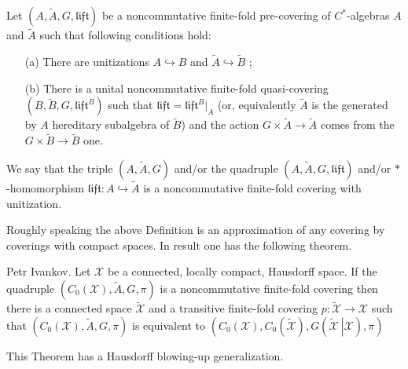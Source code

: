 \documentclass{beamer}
\theoremstyle{plain}
\newcommand{\lift}{\mathfrak{lift}}
\newcommand{\sX}{\mathcal{X}}       %
\newcommand{\hookto}{\hookrightarrow}        %
\begin{document}
\begin{frame}
	
\begin{definition}
	Let $\left(A, \widetilde{A}, G, \lift \right)$ be a noncommutative finite-fold  pre-covering  of $C^*$-algebras $A$ and $\widetilde{A}$ such  that following conditions hold:
	\begin{enumerate}
		\item[(a)] 
		There are unitizations $A \hookto B$  and $\widetilde{A} \hookto \widetilde{B}$ ;
		\item[(b)] There is a %
		unital  noncommutative finite-fold quasi-covering	$\left(B ,\widetilde{B}, G, {\lift}^B \right)$  such that
		$\lift = {\lift}^B|_A$ (or, equivalently $\widetilde A$ is the generated by $A$ hereditary subalgebra of $\widetilde B$) and
		the action $G \times\widetilde{A} \to \widetilde{A}$ comes from  the $G \times\widetilde{B} \to \widetilde{B}$ one.
	\end{enumerate}
	We say that the triple $\left(A, \widetilde{A}, G \right)$ and/or the quadruple $\left(A, \widetilde{A}, G, \lift \right)$ and/or $*$-homomorphism $\lift: A \hookto \widetilde{A}$ is a
	\alert{noncommutative finite-fold covering with unitization}. 
\end{definition}

\end{frame}
\begin{frame}
	Roughly speaking the above  Definition is an approximation of any covering by coverings with compact spaces.	
	In result one has the following theorem.
	\begin{theorem}
		\alert{Petr Ivankov}. 	Let $\mathcal X$ be a connected, locally compact, Hausdorff space.
		If the  quadruple $\left(C_0\left(\mathcal  X \right), \widetilde{A}, G,    \pi\right)$ is a noncommutative finite-fold covering then there is a connected space $\widetilde{   \mathcal X }$ and a transitive finite-fold covering  $p: \widetilde{   \mathcal X } \to \sX$ such that
		$\left(C_0\left(\mathcal  X \right), \widetilde{A}, G,    \pi\right)$ is equivalent to $\left(C_0\left( {   \mathcal X }\right), C_0\left( \widetilde{   \mathcal X }\right), G\left(\left. \widetilde{   \mathcal X } ~\right| {   \mathcal X }\right), \pi\right)$
	\end{theorem}
This Theorem has a Hausdorff blowing-up generalization.
\end{frame}
\end{document}
